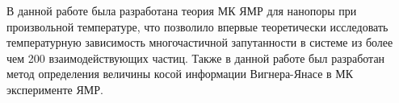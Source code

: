 В данной работе была разработана теория МК ЯМР для нанопоры при произвольной температуре,
что позволило впервые теоретически исследовать температурную зависимость многочастичной запутанности в системе из более чем 200 взаимодействующих частиц.
Также в данной работе был разработан метод определения величины косой информации Вигнера-Янасе в МК эксперименте ЯМР.
